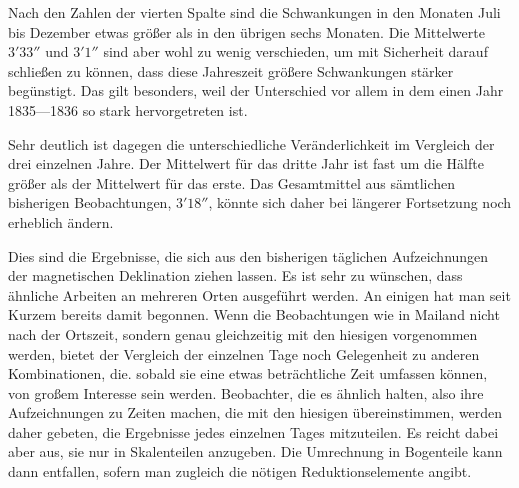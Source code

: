 Nach den Zahlen der vierten Spalte sind die Schwankungen in den Monaten Juli bis Dezember etwas größer als in den übrigen sechs Monaten. Die Mittelwerte $3'33''$ und $3'1''$ sind aber wohl zu wenig verschieden, um mit Sicherheit darauf schließen zu können, dass diese Jahreszeit größere Schwankungen stärker begünstigt. Das gilt besonders, weil der Unterschied vor allem in dem einen Jahr 1835---1836 so stark hervorgetreten ist.

Sehr deutlich ist dagegen die unterschiedliche Veränderlichkeit im Vergleich der drei einzelnen Jahre. Der Mittelwert für das dritte Jahr ist fast um die Hälfte größer als der Mittelwert für das erste. Das Gesamtmittel
aus sämtlichen bisherigen Beobachtungen, $3'18''$, könnte sich daher bei längerer Fortsetzung noch erheblich ändern.

Dies sind die Ergebnisse, die sich aus den bisherigen täglichen Aufzeichnungen der magnetischen Deklination ziehen lassen. Es ist sehr zu wünschen, dass ähnliche Arbeiten an mehreren Orten ausgeführt werden. An einigen hat man seit Kurzem bereits damit begonnen. Wenn die Beobachtungen wie in Mailand nicht nach der Ortszeit, sondern genau gleichzeitig mit den hiesigen vorgenommen werden, bietet der Vergleich der einzelnen Tage noch Gelegenheit zu anderen Kombinationen, die. sobald sie eine etwas beträchtliche Zeit umfassen können, von großem Interesse sein werden. Beobachter, die es ähnlich halten, also ihre Aufzeichnungen zu Zeiten machen, die mit den hiesigen übereinstimmen, werden daher gebeten, die Ergebnisse jedes einzelnen Tages mitzuteilen. Es reicht dabei aber aus, sie nur in Skalenteilen anzugeben. Die Umrechnung in Bogenteile kann dann entfallen, sofern man zugleich die nötigen Reduktionselemente angibt.


